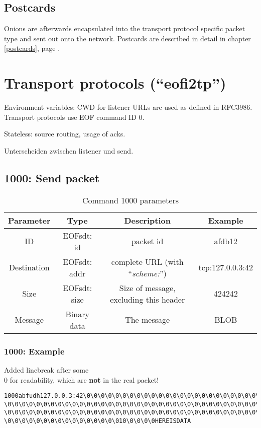 \documentclass[12pt,a4paper]{book}
\begin{document}
\subsection{Postcards}
Onions are afterwards encapsulated into the transport protocol specific
packet type and sent out onto the network.
Postcards are described in detail in chapter \ref{postcards}, page \pageref{postcards}.
\section{Transport protocols ("`eofi2tp"')}
\label{eofi2tp}
Environment variables: CWD for listener
URLs are used as defined in RFC3986\cite{uri-1}.
Transport protocols use EOF command ID 0.

Stateless: source routing, usage of acks.

Unterscheiden zwischen listener und send.
\subsection{1000: Send packet}
\begin{longtable}{|c|c|c|c|}
\caption{Command 1000 parameters}\\
\hline
\textbf{Parameter} & \textbf{Type} & \textbf{Description} & \textbf{Example}\\
\hline
ID & EOFsdt: id & packet id & afdb12\\
\hline
Destination & EOFsdt: addr & complete URL (with "`\emph{scheme:}"') & tcp:127.0.0.3:42\\
\hline
Size & EOFsdt: size & Size of message, excluding this header & 424242\\
\hline
Message & Binary data & The message & BLOB\\
\hline
\end{longtable}
\subsubsection{1000: Example}
Added linebreak after some \\0 for readability, which are \textbf{not} in
the real packet!
\begin{verbatim}
1000abfudh127.0.0.3:42\0\0\0\0\0\0\0\0\0\0\0\0\0\0\0\0\0\0\0\0\0\0\0\0\0\0\0\0
\0\0\0\0\0\0\0\0\0\0\0\0\0\0\0\0\0\0\0\0\0\0\0\0\0\0\0\0\0\0\0\0\0\0\0\0
\0\0\0\0\0\0\0\0\0\0\0\0\0\0\0\0\0\0\0\0\0\0\0\0\0\0\0\0\0\0\0\0\0\0\0\0
\0\0\0\0\0\0\0\0\0\0\0\0\0\0\0\010\0\0\0\0HEREISDATA
\end{verbatim}
\end{document}
